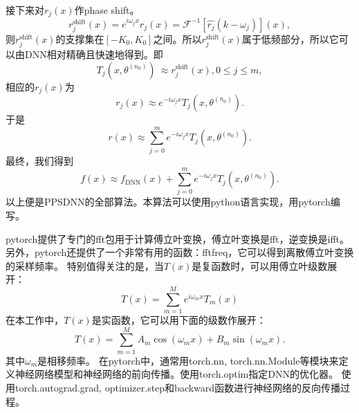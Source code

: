 接下来对$r_j(x)$作phase shift。
\begin{equation}
r_{j}^{\text{shift}}(x)=e^{i\omega_jx}r_j(x)=\mathcal{F}^{-1}\left[  \widehat{r_{j}}(k-\omega
_{j})\right]  (x),\label{rjshift}%
\end{equation}
则$r_{j}^{\text{shift}}(x)$的支撑集在$[-K_0,K_0]$之间。所以$r_{j}^{\text{shift}}(x)$属于低频部分，所以它可以由DNN相对精确且快速地得到。即
\begin{equation}
T_{j}(x,\theta^{(n_{0})})\ \approx r_{j}^{\text{shift}}(x),0\leq j\leq m,
\end{equation}
相应的$r_j(x)$为
\begin{equation}
r_{j}(x)\approx e^{-i\omega_{j}x}T_{j}(x,\theta^{(n_{0})}).
\end{equation}
于是
\begin{equation}
r(x)\approx%
{\displaystyle\sum\limits_{j=0}^{m}}
e^{-i\omega_{j}x}T_{j}(x,\theta^{(n_{0})}).
\end{equation}
最终，我们得到
\begin{equation}
f(x) \approx f_{\text{DNN}}(x)+%
{\displaystyle\sum\limits_{j=0}^{m}}
e^{-i\omega_{j}x}T_{j}(x,\theta^{(n_{0})}). \label{DNNupdate}%
\end{equation}
以上便是PPSDNN的全部算法。本算法可以使用python语言实现，用pytorch\cite{ketkar2021introduction}编写。

pytorch提供了专门的fft包用于计算傅立叶变换，傅立叶变换是fft，逆变换是ifft。另外，pytorch还提供了一个非常有用的函数：fftfreq，它可以得到离散傅立叶变换的采样频率。
特别值得关注的是，当$T(x)$是复函数时，可以用傅立叶级数展开：
\begin{equation}\label{}
    T(x)=\sum_{m=1}^{M} e^{i \omega_{m} x} T_{m}(x)
\end{equation}
在本工作中，$T(x)$是实函数，它可以用下面的级数作展开：
\begin{equation}\label{}
    T(x)=\sum_{m=1}^{M} A_{m} \cos \left(\omega_{m} x\right)+B_{m} \sin \left(\omega_{m} x\right).
\end{equation}
其中$\omega_{m}$是相移频率。
在pytorch中，通常用torch.nn, torch.nn.Module等模块来定义神经网络模型和神经网络的前向传播。使用torch.optim指定DNN的优化器。
使用torch.autograd.grad, optimizer.step和backward函数进行神经网络的反向传播过程。

